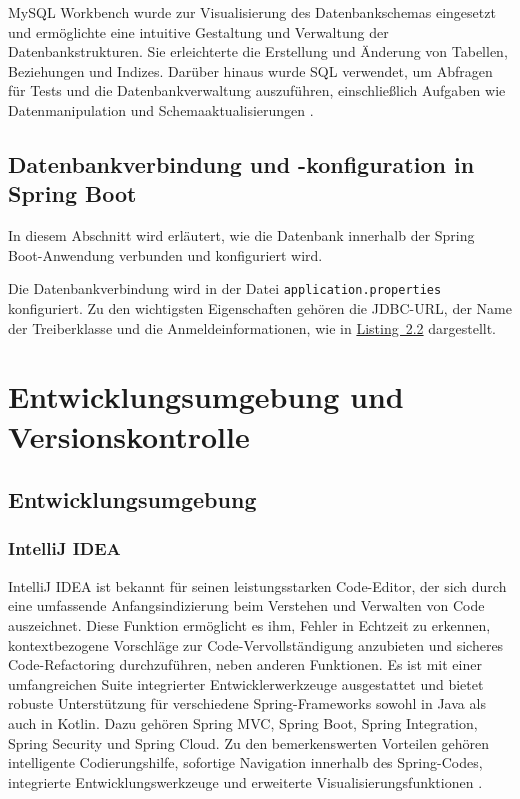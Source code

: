 MySQL Workbench wurde zur Visualisierung des Datenbankschemas eingesetzt und ermöglichte eine intuitive Gestaltung und Verwaltung der Datenbankstrukturen. Sie erleichterte die Erstellung und Änderung von Tabellen, Beziehungen und Indizes. Darüber hinaus wurde SQL verwendet, um Abfragen für Tests und die Datenbankverwaltung auszuführen, einschließlich Aufgaben wie Datenmanipulation und Schemaaktualisierungen \cite{mySQL:o.J}.

\subsection{Datenbankverbindung und -konfiguration in Spring Boot}
In diesem Abschnitt wird erläutert, wie die Datenbank innerhalb der Spring Boot-Anwendung verbunden und konfiguriert wird.

Die Datenbankverbindung wird in der Datei \texttt{application.properties} konfiguriert. Zu den wichtigsten Eigenschaften gehören die JDBC-URL, der Name der Treiberklasse und die Anmeldeinformationen, wie in \hyperref[Application.properties]{Listing~2.2} dargestellt.


\section{Entwicklungsumgebung und Versionskontrolle}

\subsection{Entwicklungsumgebung}


\subsubsection{IntelliJ IDEA}

IntelliJ IDEA ist bekannt für seinen leistungsstarken Code-Editor, der sich durch eine umfassende Anfangsindizierung beim Verstehen und Verwalten von Code auszeichnet. Diese Funktion ermöglicht es ihm, Fehler in Echtzeit zu erkennen, kontextbezogene Vorschläge zur Code-Vervollständigung anzubieten und sicheres Code-Refactoring durchzuführen, neben anderen Funktionen. Es ist mit einer umfangreichen Suite integrierter Entwicklerwerkzeuge ausgestattet und bietet robuste Unterstützung für verschiedene Spring-Frameworks sowohl in Java als auch in Kotlin. Dazu gehören Spring MVC, Spring Boot, Spring Integration, Spring Security und Spring Cloud. Zu den bemerkenswerten Vorteilen gehören intelligente Codierungshilfe, sofortige Navigation innerhalb des Spring-Codes, integrierte Entwicklungswerkzeuge und erweiterte Visualisierungsfunktionen \cite{Jetbrains:o.J}.


